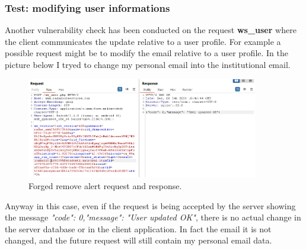 		\subsubsection{Test: modifying user informations}
			\par Another vulnerability check has been conducted on the request \textbf{ws\_user} where the client communicates the update relative to a user profile. For example a possible request might be to modify the email relative to a user profile. In the picture below I tryed to change my personal email into the institutional email.
			\begin{figure}[ht]
				\centering
				\includegraphics[width=0.9\textwidth]{images/radarbot_changeemail.png}
				\caption{Forged remove alert request and response.}
			\end{figure}
			\par Anyway in this case, even if the request is being accepted by the server showing the message \textit{"code": 0,"message": "User updated OK"}, there is no actual change in the server database or in the client application. In fact the email it is not changed, and the future request will still contain my personal email data.
			\newpage